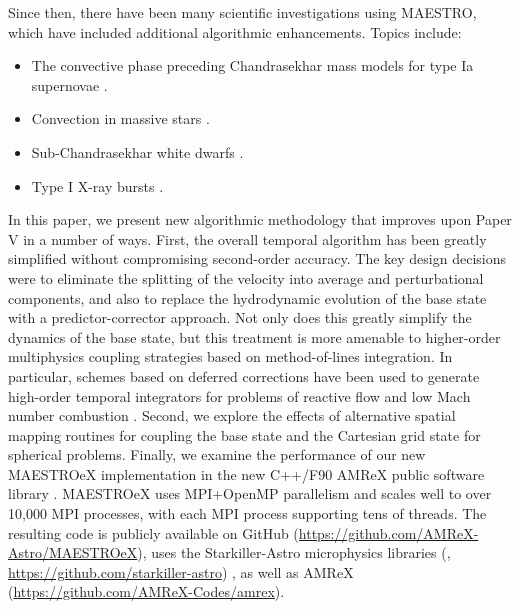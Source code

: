 \documentclass{aastex62}
\begin{document}
Since then, there have been many scientific investigations using MAESTRO, which have included additional algorithmic enhancements.  Topics include:
\begin{itemize}
\item The convective phase preceding Chandrasekhar mass models for type Ia supernovae \citep{MAESTRO_convection,MAESTRO_AMR,MAESTRO_CASTRO}.
\item Convection in massive stars \citep{Gilet:2013,gilkis:2016}.
\item Sub-Chandrasekhar white dwarfs \citep{subChandra_I,subChandra_II}.
\item Type I X-ray bursts \citep{XRB_I,XRB_II,XRB_III}.
\end{itemize}

In this paper, we present new algorithmic methodology that improves upon Paper V in a number of ways.
First, the overall temporal algorithm has been greatly simplified without compromising second-order accuracy.
The key design decisions were to eliminate the splitting of the velocity into average and perturbational components,
and also to replace the hydrodynamic evolution of the base state with a predictor-corrector approach.
Not only does this greatly simplify the dynamics of the base
state, but this treatment is more amenable to higher-order multiphysics coupling strategies
based on method-of-lines integration.
In particular, schemes based on deferred corrections \citep{dutt2000spectral} have been used to generate 
high-order temporal integrators for problems of reactive flow and low Mach number combustion \citep{pazner2016high,nonaka2018conservative}.
Second, we explore the effects of alternative spatial mapping routines for coupling the base state and the Cartesian grid state for spherical problems.
Finally, we examine the performance of our new MAESTROeX implementation in the new C++/F90 AMReX public software library \citep{AMReX,AMReX_JOSS}.
MAESTROeX uses MPI+OpenMP parallelism and scales well to over 10,000 MPI processes, with each MPI process supporting tens of threads.
The resulting code is publicly available on GitHub (\url{https://github.com/AMReX-Astro/MAESTROeX}),
uses the Starkiller-Astro microphysics libraries (\citealt{starkiller}, \url{https://github.com/starkiller-astro}) ,
as well as AMReX (\url{https://github.com/AMReX-Codes/amrex}).
\end{document}
